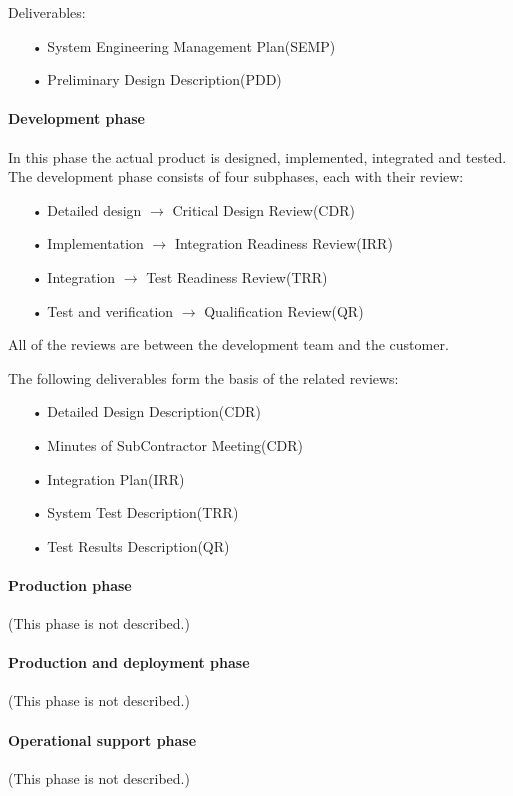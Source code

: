 Deliverables:
\begin{enumerate}
\item[•] System Engineering Management Plan(SEMP)
\item[•] Preliminary Design Description(PDD)
\end{enumerate}


\paragraph{Development phase}
In this phase the actual product is designed, implemented, integrated and tested. The development phase consists of four subphases, each with their review: 
\begin{enumerate}
\item[•] Detailed design $\rightarrow$ Critical Design Review(CDR)
\item[•] Implementation $\rightarrow$ Integration Readiness Review(IRR)
\item[•] Integration $\rightarrow$ Test Readiness Review(TRR)
\item[•] Test and verification $\rightarrow$ Qualification Review(QR)
\end{enumerate}
All of the reviews are between the development team and the customer.

The following deliverables form the basis of the related reviews:
\begin{enumerate}
\item[•] Detailed Design Description(CDR)
\item[•] Minutes of SubContractor Meeting(CDR)
\item[•] Integration Plan(IRR)
\item[•] System Test Description(TRR)
\item[•] Test Results Description(QR)
\end{enumerate}


\paragraph{Production phase}
(This phase is not described.)

\paragraph{Production and deployment phase}
(This phase is not described.)

\paragraph{Operational support phase}
(This phase is not described.)